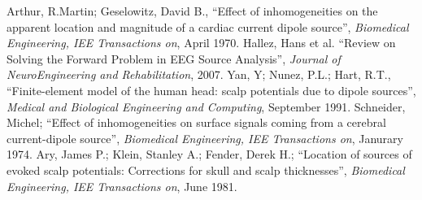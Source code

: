 \documentclass{article}
\begin{document}
\begin{thebibliography}{3}
            Arthur, R.Martin; Geselowitz, David B., ``Effect of inhomogeneities on the apparent location and magnitude of a cardiac current dipole source'', \emph{Biomedical Engineering, IEE Transactions on}, April 1970.
            Hallez, Hans et al. ``Review on Solving the Forward Problem in EEG Source Analysis'', \emph{Journal of NeuroEngineering and Rehabilitation}, 2007.
            Yan, Y; Nunez, P.L.; Hart, R.T., ``Finite-element model of the human head: scalp potentials due to dipole sources'', \emph{Medical and Biological Engineering and Computing}, September 1991.
            Schneider, Michel; ``Effect of inhomogeneities on surface signals coming from a cerebral current-dipole source'', \emph{Biomedical Engineering, IEE Transactions on}, Janurary 1974.
            Ary, James P.; Klein, Stanley A.; Fender, Derek H.; ``Location of sources of evoked scalp potentials: Corrections for skull and scalp thicknesses'', \emph{Biomedical Engineering, IEE Transactions on}, June 1981.

\end{thebibliography}
\end{document}

